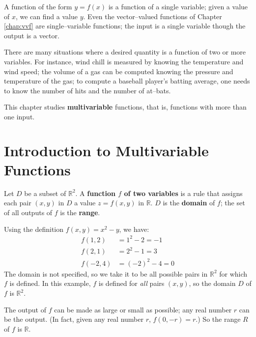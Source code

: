 A function of the form $y=f(x)$ is a function of a single variable; given a value of $x$, we can find a value $y$. Even the vector--valued functions of Chapter \ref{chap:vvf} are single--variable functions; the input is a single variable though the output is a vector.

There are many situations where a desired quantity is a function of two or more variables. For instance, wind chill is measured by knowing the temperature and wind speed; the volume of a gas can be computed knowing the pressure and temperature of the gas; to compute a baseball player's batting average, one needs to know the number of hits and the number of at--bats. 

This chapter studies \textbf{multivariable} functions, that is, functions with more than one input.

\section{Introduction to Multivariable Functions}\label{sec:multi_intro}

{Let $D$ be a subset of $\mathbb{R}^2$. A \textbf{function $f$ of two variables} is a rule that assigns each pair $(x,y)$ in $D$ a value $z=f(x,y)$ in $\mathbb{R}$. $D$ is the \textbf{domain} of $f$; the set of all outputs of $f$ is the \textbf{range}.
}

{Using the definition $f(x,y) = x^2-y$, we have:
\begin{align*}
f(1,2) &= 1^2-2 = -1\\
f(2,1) &=	2^2-1 = 3\\
f(-2,4) &= (-2)^2-4 = 0
\end{align*}
The domain is not specified, so we take it to be all possible pairs in $\mathbb{R}^2$ for which $f$ is defined. In this example, $f$ is defined for \emph{all} pairs $(x,y)$, so the domain $D$ of $f$ is $\mathbb{R}^2$. 
\enlargethispage{3\baselineskip}

The output of $f$ can be made as large or small as possible; any real number $r$ can be the output. (In fact, given any real number $r$, $f(0,-r)=r$.) So the range $R$ of $f$ is $\mathbb{R}$.
}\\


